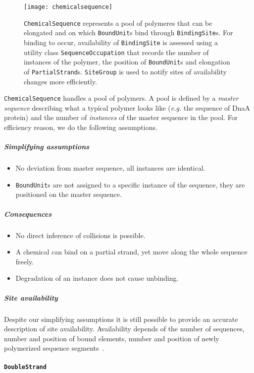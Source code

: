 \begin{figure}[!h]
  \centering
  \texttt{[image: chemicalsequence]}
  \caption{\texttt{ChemicalSequence} represents a pool of polymeres that can be elongated and on which \texttt{BoundUnit}s bind through \texttt{BindingSite}s. For binding to occur, availability of \texttt{BindingSite} is assessed using a utility class \texttt{SequenceOccupation} that records the number of instances of the polymer, the position of \texttt{BoundUnit}s and elongation of \texttt{PartialStrand}s. \texttt{SiteGroup} is used to notify sites of availability changes more efficiently.}
  \label{fig:det_chemical_sequence}
\end{figure}

\texttt{ChemicalSequence} handles a pool of polymers. A pool is defined by a \emph{master sequence} describing what a typical polymer looks like (\textit{e.g.} the sequence of DnaA protein) and the number of \emph{instances} of the master sequence in the pool. For efficiency reason, we do the following assumptions.

\subparagraph{Simplifying assumptions}
\begin{itemize}
\item No deviation from master sequence, all instances are identical.
\item \texttt{BoundUnit}s are not assigned to a specific instance of the sequence, they are positioned on the  master sequence.
\end{itemize}

\subparagraph{Consequences}
\begin{itemize}
\item No direct inference of collisions is possible.
\item A chemical can bind on a partial strand, yet move along the whole sequence freely.
\item Degradation of an instance does not cause unbinding.
\end{itemize}

\subparagraph{Site availability}
Despite our simplifying assumptions it is still possible to provide an accurate description of site availability. Availability depends of the number of sequences, number and position of bound elements, number and position of newly polymerized sequence segments~.

\paragraph{\texttt{DoubleStrand}}

